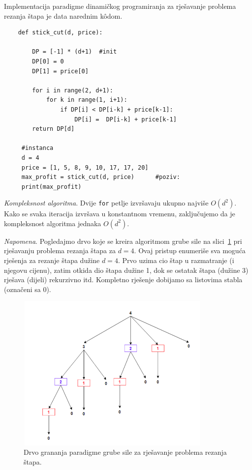  Implementacija paradigme dinamičkog programiranja za rješavanje problema  rezanja štapa je data narednim k\^odom. 
 
 \begin{verbatim}
	def stick_cut(d, price):

		DP = [-1] * (d+1)  #init
		DP[0] = 0
		DP[1] = price[0]

		for i in range(2, d+1):
			for k in range(1, i+1):
				if DP[i] < DP[i-k] + price[k-1]: 
					DP[i] =  DP[i-k] + price[k-1]
		return DP[d]       
     
     #instanca
     d = 4
     price = [1, 5, 8, 9, 10, 17, 17, 20] 
     max_profit = stick_cut(d, price)      #poziv:
     print(max_profit)
 \end{verbatim}

\textit{Kompleksnost algoritma}. Dvije \texttt{for} petlje izvršavaju ukupno najviše $O(d^2)$. Kako se svaka iteracija izvršava u konstantnom vremenu, zaključujemo da je kompleksnost algoritma jednaka $O(d^2)$.

\textit{Napomena}. Pogledajmo drvo koje se kreira algoritmom grube sile na slici~\ref{fig:brute-force-stick-cut}  pri rješavanju problema rezanja štapa za $d=4$. Ovaj pristup enumeriše sva moguća rješenja za rezanje štapa dužine $d=4$. Prvo uzima cio štap u razmatranje (i njegovu cijenu), zatim otkida dio štapa dužine 1, dok se ostatak štapa (dužine 3) rješava (dijeli) rekurzivno itd. Kompletno rješenje dobijamo sa listovima stabla (označeni sa 0). 
\begin{center}
	\begin{figure}[H]
		\centering
		\includegraphics[width=270pt,height=220pt]{slike/brute-force-cutting-stick.png}
		
		\caption{Drvo grananja paradigme grube sile za rješavanje problema rezanja štapa.}\label{fig:brute-force-stick-cut}
	\end{figure}
\end{center}



